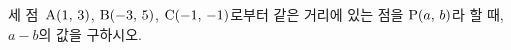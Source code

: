 세 점~$\mathrm{A}(1,\,3)$, $\mathrm{B}(-3,\,5)$, $\mathrm{C}(-1,\,-1)$로부터 같은 거리에 있는 점을 $\mathrm{P}(a,\,b)$라 할 때, $a-b$의 값을 구하시오.
